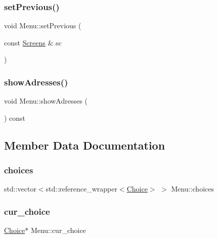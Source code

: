 \subsubsection{\texorpdfstring{set\+Previous()}{setPrevious()}}
{\footnotesize\ttfamily void Menu\+::set\+Previous (\begin{DoxyParamCaption}\item[{const \hyperlink{_globals_8h_a3d5776bab98402b03be09156bacf4f68}{Screens} \&}]{sc }\end{DoxyParamCaption})}

\mbox{\label{class_menu_ac4cf83e0769be3a20583668f210d98ef}} 
\subsubsection{\texorpdfstring{show\+Adresses()}{showAdresses()}}
{\footnotesize\ttfamily void Menu\+::show\+Adresses (\begin{DoxyParamCaption}{ }\end{DoxyParamCaption}) const\hspace{0.3cm}{\ttfamily [virtual]}}



\subsection{Member Data Documentation}
\mbox{\label{class_menu_aa40e2b74e7bdeee960889e083eca15d2}} 
\subsubsection{\texorpdfstring{choices}{choices}}
{\footnotesize\ttfamily std\+::vector$<$std\+::reference\+\_\+wrapper$<$\hyperlink{class_choice}{Choice}$>$ $>$ Menu\+::choices\hspace{0.3cm}{\ttfamily [protected]}}

\mbox{\label{class_menu_a91fc2547256d492def0845bd1ebcfaf8}} 
\subsubsection{\texorpdfstring{cur\+\_\+choice}{cur\_choice}}
{\footnotesize\ttfamily \hyperlink{class_choice}{Choice}$\ast$ Menu\+::cur\+\_\+choice\hspace{0.3cm}{\ttfamily [protected]}}




